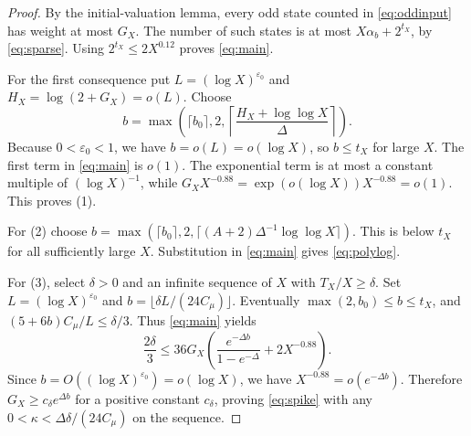 \documentclass[11pt,a4paper]{article}
\begin{document}
\begin{proof}
By the initial-valuation lemma, every odd state counted in
\eqref{eq:oddinput} has weight at most $G_X$. The number of such
states is at most $X\alpha_b+2^{t_X}$, by \eqref{eq:sparse}.
Using $2^{t_X}\le2X^{0.12}$ proves \eqref{eq:main}.

For the first consequence put $L=(\log X)^{\varepsilon_0}$ and
$H_X=\log(2+G_X)=o(L)$. Choose
\[
 b=\max\left(\lceil b_0\rceil,2,
 \left\lceil\frac{H_X+\log\log X}{\Delta}\right\rceil\right).
\]
Because $0<\varepsilon_0<1$, we have $b=o(L)=o(\log X)$, so
$b\le t_X$ for large $X$. The first term in \eqref{eq:main}
is $o(1)$. The exponential term is at most a constant multiple
of $(\log X)^{-1}$, while
$G_X X^{-0.88}=\exp(o(\log X))X^{-0.88}=o(1)$.
This proves (1).

For (2) choose
$b=\max(\lceil b_0\rceil,2,
\lceil (A+2)\Delta^{-1}\log\log X\rceil)$.
This is below $t_X$ for all sufficiently large $X$.
Substitution in \eqref{eq:main} gives \eqref{eq:polylog}.

For (3), select $\delta>0$ and an infinite sequence of $X$
with $T_X/X\ge\delta$. Set $L=(\log X)^{\varepsilon_0}$ and
$b=\lfloor\delta L/(24C_\mu)\rfloor$. Eventually
$\max(2,b_0)\le b\le t_X$, and
$(5+6b)C_\mu/L\le\delta/3$.
Thus \eqref{eq:main} yields
\[
 \frac{2\delta}{3}\le
 36G_X\left(\frac{e^{-\Delta b}}{1-e^{-\Delta}}
 +2X^{-0.88}\right).
\]
Since $b=O((\log X)^{\varepsilon_0})=o(\log X)$,
we have $X^{-0.88}=o(e^{-\Delta b})$. Therefore
$G_X\ge c_\delta e^{\Delta b}$ for a positive constant
$c_\delta$, proving \eqref{eq:spike} with any
$0<\kappa<\Delta\delta/(24C_\mu)$ on the sequence.
\end{proof}
\end{document}
